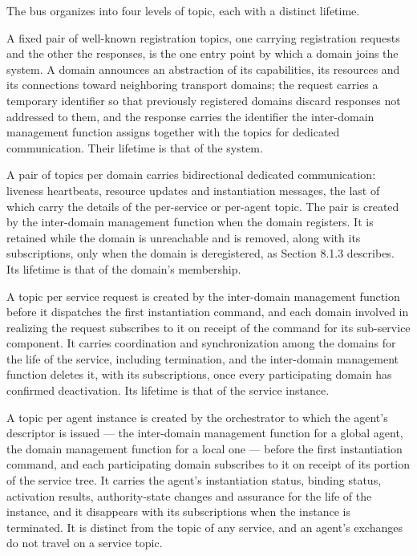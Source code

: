 The bus organizes into four levels of topic, each with a distinct
lifetime.

A fixed pair of well-known registration topics, one carrying
registration requests and the other the responses, is the one entry
point by which a domain joins the system. A domain announces an
abstraction of its capabilities, its resources and its connections
toward neighboring transport domains; the request carries a temporary
identifier so that previously registered domains discard responses not
addressed to them, and the response carries the identifier the
inter-domain management function assigns together with the topics for
dedicated communication. Their lifetime is that of the system.

A pair of topics per domain carries bidirectional dedicated
communication: liveness heartbeats, resource updates and instantiation
messages, the last of which carry the details of the per-service or
per-agent topic. The pair is created by the inter-domain management
function when the domain registers. It is retained while the domain is
unreachable and is removed, along with its subscriptions, only when the
domain is deregistered, as Section 8.1.3 describes. Its lifetime is that
of the domain's membership.

A topic per service request is created by the inter-domain management
function before it dispatches the first instantiation command, and each
domain involved in realizing the request subscribes to it on receipt of
the command for its sub-service component. It carries coordination and
synchronization among the domains for the life of the service, including
termination, and the inter-domain management function deletes it, with
its subscriptions, once every participating domain has confirmed
deactivation. Its lifetime is that of the service instance.

A topic per agent instance is created by the orchestrator to which the
agent's descriptor is issued --- the inter-domain management function
for a global agent, the domain management function for a local one ---
before the first instantiation command, and each participating domain
subscribes to it on receipt of its portion of the service tree. It
carries the agent's instantiation status, binding status, activation
results, authority-state changes and assurance for the life of the
instance, and it disappears with its subscriptions when the instance is
terminated. It is distinct from the topic of any service, and an agent's
exchanges do not travel on a service topic.

